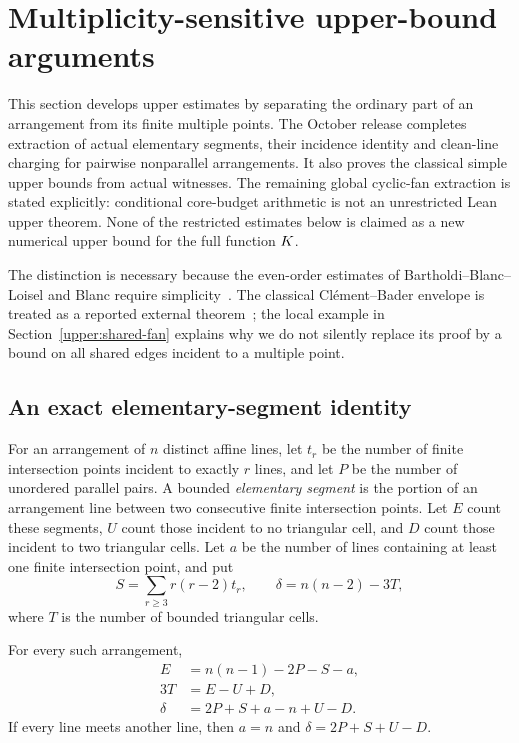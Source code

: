 \section{Multiplicity-sensitive upper-bound arguments}
\label{upper:scope}

This section develops upper estimates by separating the ordinary part of an arrangement from its finite multiple points. The October release completes extraction of actual elementary segments, their incidence identity and clean-line charging for pairwise nonparallel arrangements. It also proves the classical simple upper bounds from actual witnesses. The remaining global cyclic-fan extraction is stated explicitly: conditional core-budget arithmetic is not an unrestricted Lean upper theorem. None of the restricted estimates below is claimed as a new numerical upper bound for the full function $K$.

The distinction is necessary because the even-order estimates of Bartholdi--Blanc--Loisel and Blanc require simplicity~\citep{bbl2008,blanc2011}. The classical Cl\'ement--Bader envelope is treated as a reported external theorem~\citep{clementbader2007}; the local example in Section~\ref{upper:shared-fan} explains why we do not silently replace its proof by a bound on all shared edges incident to a multiple point.

\subsection{An exact elementary-segment identity}

\begin{definition}
For an arrangement of $n$ distinct affine lines, let $t_r$ be the number of finite intersection points incident to exactly $r$ lines, and let $P$ be the number of unordered parallel pairs. A bounded \emph{elementary segment} is the portion of an arrangement line between two consecutive finite intersection points. Let $E$ count these segments, $U$ count those incident to no triangular cell, and $D$ count those incident to two triangular cells. Let $a$ be the number of lines containing at least one finite intersection point, and put
\[
 S=\sum_{r\ge3}r(r-2)t_r,\qquad
 \delta=n(n-2)-3T,
\]
where $T$ is the number of bounded triangular cells.
\end{definition}

\begin{proposition}
\label{upper:identity}
For every such arrangement,
\begin{align}
 E&=n(n-1)-2P-S-a,\\
 3T&=E-U+D,\\
 \delta&=2P+S+a-n+U-D.
 \label{upper:defect-general}
\end{align}
If every line meets another line, then $a=n$ and $\delta=2P+S+U-D$.
\end{proposition}

